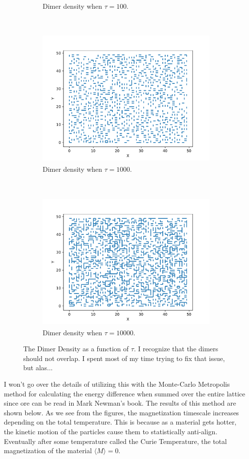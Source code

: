 \documentclass{article}
\begin{document}
\begin{enumerate}
{\begin{figure}[h!]
\begin{subfigure}[t]{0.3\textwidth}
        \caption{Dimer density when $\tau = 100$.}
    \end{subfigure}%
    ~ 
    \begin{subfigure}[t]{0.3\textwidth}
        \centering
        \includegraphics[width =\textwidth, height=7cm]{dimer1000.pdf}
        \caption{Dimer density when $\tau = 1000$.}
    \end{subfigure}
    ~
    \begin{subfigure}[t]{0.3\textwidth}
        \centering
        \includegraphics[width=\textwidth, height=7cm]{dimer10000.pdf}
        \caption{Dimer density when $\tau = 10000$.}
    \end{subfigure}
    \caption{The Dimer Density as a function of $\tau$. I recognize that the dimers should not overlap. I spent most of my time trying to fix that issue, but alas...}
    \end{figure}
    I won't go over the details of utilizing this with the Monte-Carlo Metropolis method for calculating the energy difference when summed over the entire lattice since ore can be read in Mark Newman's book. The results of this method are shown below.
   As we see from the figures, the magnetization timescale increases depending on the total temperature. This is because as a material gets hotter, the kinetic motion of the particles cause them to statistically anti-align. Eventually after some temperature called the Curie Temperature, the total magnetization of the material $\langle M \rangle = 0$.
}
\end{enumerate}
\end{document}
